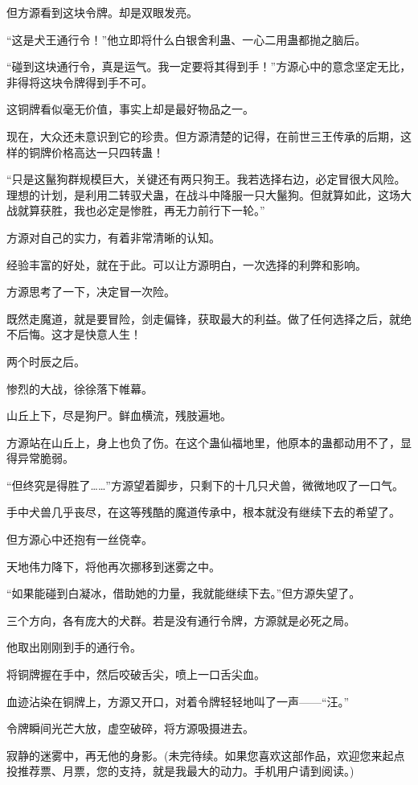\begin{this_body}
但方源看到这块令牌。却是双眼发亮。

“这是犬王通行令！”他立即将什么白银舍利蛊、一心二用蛊都抛之脑后。

“碰到这块通行令，真是运气。我一定要将其得到手！”方源心中的意念坚定无比，非得将这块令牌得到手不可。

这铜牌看似毫无价值，事实上却是最好物品之一。

现在，大众还未意识到它的珍贵。但方源清楚的记得，在前世三王传承的后期，这样的铜牌价格高达一只四转蛊！

“只是这鬣狗群规模巨大，关键还有两只狗王。我若选择右边，必定冒很大风险。理想的计划，是利用二转驭犬蛊，在战斗中降服一只大鬣狗。但就算如此，这场大战就算获胜，我也必定是惨胜，再无力前行下一轮。”

方源对自己的实力，有着非常清晰的认知。

经验丰富的好处，就在于此。可以让方源明白，一次选择的利弊和影响。

方源思考了一下，决定冒一次险。

既然走魔道，就是要冒险，剑走偏锋，获取最大的利益。做了任何选择之后，就绝不后悔。这才是快意人生！

两个时辰之后。

惨烈的大战，徐徐落下帷幕。

山丘上下，尽是狗尸。鲜血横流，残肢遍地。

方源站在山丘上，身上也负了伤。在这个蛊仙福地里，他原本的蛊都动用不了，显得异常脆弱。

“但终究是得胜了……”方源望着脚步，只剩下的十几只犬兽，微微地叹了一口气。

手中犬兽几乎丧尽，在这等残酷的魔道传承中，根本就没有继续下去的希望了。

但方源心中还抱有一丝侥幸。

天地伟力降下，将他再次挪移到迷雾之中。

“如果能碰到白凝冰，借助她的力量，我就能继续下去。”但方源失望了。

三个方向，各有庞大的犬群。若是没有通行令牌，方源就是必死之局。

他取出刚刚到手的通行令。

将铜牌握在手中，然后咬破舌尖，喷上一口舌尖血。

血迹沾染在铜牌上，方源又开口，对着令牌轻轻地叫了一声——“汪。”

令牌瞬间光芒大放，虚空破碎，将方源吸摄进去。

寂静的迷雾中，再无他的身影。(未完待续。如果您喜欢这部作品，欢迎您来起点投推荐票、月票，您的支持，就是我最大的动力。手机用户请到阅读。)

\end{this_body}

